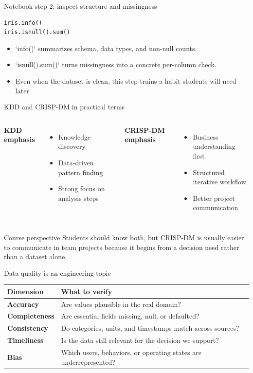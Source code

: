 \begin{frame}[fragile]{Notebook step 2: inspect structure and missingness}
\begin{lstlisting}[style=coursepython]
iris.info()
iris.isnull().sum()
\end{lstlisting}
\begin{itemize}
\item `info()` summarizes schema, data types, and non-null counts.
\item `isnull().sum()` turns missingness into a concrete per-column check.
\item Even when the dataset is clean, this step trains a habit students will need later.
\end{itemize}
\coursefooter
\end{frame}

\begin{frame}{KDD and CRISP-DM in practical terms}
\begin{columns}[T]
\textbf{KDD emphasis}
\begin{itemize}
\item Knowledge discovery
\item Data-driven pattern finding
\item Strong focus on analysis steps
\end{itemize}
\textbf{CRISP-DM emphasis}
\begin{itemize}
\item Business understanding first
\item Structured iterative workflow
\item Better project communication
\end{itemize}
\end{columns}
\vspace{0.6em}
\begin{block}{Course perspective}
Students should know both, but CRISP-DM is usually easier to communicate in team projects because it begins from a decision need rather than a dataset alone.
\end{block}
\coursefooter
\end{frame}

\begin{frame}{Data quality is an engineering topic}
\begin{tabularx}{\textwidth}{>{\bfseries}l X}
Dimension & What to verify \\
\toprule
Accuracy & Are values plausible in the real domain? \\
Completeness & Are essential fields missing, null, or defaulted? \\
Consistency & Do categories, units, and timestamps match across sources? \\
Timeliness & Is the data still relevant for the decision we support? \\
Bias & Which users, behaviors, or operating states are underrepresented? \\
\bottomrule
\end{tabularx}
\coursefooter
\end{frame}

